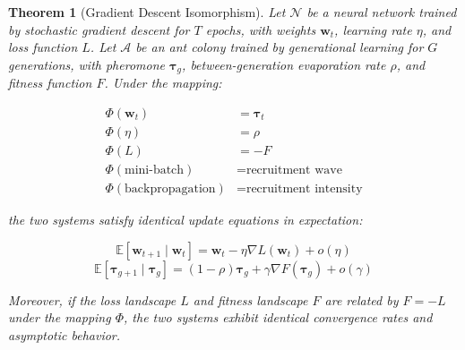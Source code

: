 \documentclass[12pt,letterpaper]{article}
\newtheorem{theorem}{Theorem}[section]
\begin{document}
\begin{theorem}[Gradient Descent Isomorphism]
\label{thm:gradient_iso}
Let $\mathcal{N}$ be a neural network trained by stochastic gradient descent for $T$ epochs, with weights $\mathbf{w}_t$, learning rate $\eta$, and loss function $L$. Let $\mathcal{A}$ be an ant colony trained by generational learning for $G$ generations, with pheromone $\boldsymbol{\tau}_g$, between-generation evaporation rate $\rho$, and fitness function $F$. Under the mapping:

\begin{align*}
\Phi(\mathbf{w}_t) &= \boldsymbol{\tau}_t \\
\Phi(\eta) &= \rho \\
\Phi(L) &= -F \\
\Phi(\text{mini-batch}) &= \text{recruitment wave} \\
\Phi(\text{backpropagation}) &= \text{recruitment intensity}
\end{align*}

the two systems satisfy identical update equations in expectation:

\begin{equation}
\mathbb{E}[\mathbf{w}_{t+1} \mid \mathbf{w}_t] = \mathbf{w}_t - \eta \nabla L(\mathbf{w}_t) + o(\eta) \label{eq:sgd_expect}
\end{equation}
\begin{equation}
\mathbb{E}[\boldsymbol{\tau}_{g+1} \mid \boldsymbol{\tau}_g] = (1-\rho)\boldsymbol{\tau}_g + \gamma \nabla F(\boldsymbol{\tau}_g) + o(\gamma) \label{eq:gacl_expect}
\end{equation}

Moreover, if the loss landscape $L$ and fitness landscape $F$ are related by $F = -L$ under the mapping $\Phi$, the two systems exhibit identical convergence rates and asymptotic behavior.
\end{theorem}
\end{document}
